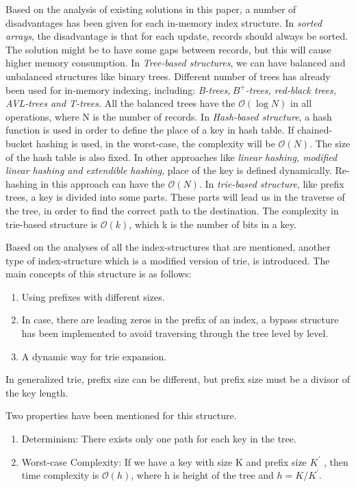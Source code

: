 \documentclass[12pt]{report}
\begin{document}
Based on the analysis of existing solutions in this paper, a number of disadvantages has been given for each in-memory index structure. In \textit {sorted arrays}, the disadvantage is that for each update, records should always be sorted. The solution might be to have some gaps between records, but this will cause higher memory consumption. In \textit {Tree-based structures}, we can have balanced and unbalanced structures like binary trees. Different number of trees has already been used for in-memory indexing, including: \textit {B-trees,$\ B^+$-trees, red-black trees, AVL-trees and T-trees.} All the balanced trees have the $\mathcal{O}(\log{}N)$ in all operations, where N is the number of records. In \textit{Hash-based structure}, a hash function is used in order to define the place of a key in hash table. If chained-bucket hashing is used, in the worst-case, the complexity will be $\mathcal{O}(N)$. The size of the hash table is also fixed. In other approaches like \textit {linear hashing, modified linear hashing and extendible hashing}, place of the key is defined dynamically. Re-hashing in this approach can have the $\mathcal{O}(N)$. In \textit{trie-based structure}, like prefix trees, a key is divided into some parts. These parts will lead us in the traverse of the tree, in order to find the correct path to the destination. The complexity in trie-based structure is $\mathcal{O}(k)$, which k is the number of bits in a key.

Based on the analyses of all the index-structures that are mentioned, another type of index-structure which is a modified version of trie, is introduced. The main concepts of this structure is as follows: 

\begin{enumerate}
\item Using prefixes with different sizes.
\item In case, there are leading zeros in the prefix of an index, a bypass structure has been implemented to avoid traversing through the tree level by level.
\item A dynamic way for trie expansion.
\end{enumerate}

In generalized trie, prefix size can be different, but prefix size must be a divisor of the key length.

Two properties have been mentioned for this structure.
\begin{enumerate}
\item Determinism: There exists only one path for each key in the tree.
\item Worst-case Complexity: If we have a key with size K and prefix size $K^{\prime}$ , then time complexity is $\mathcal{O}(h)$, where h is height of the tree and $h=K/K^{\prime}$. 
\end{enumerate}
\end{document}
